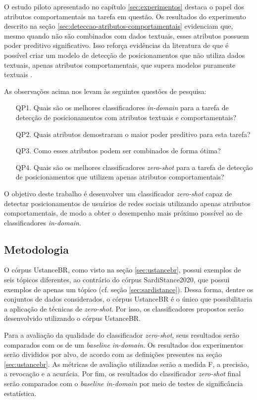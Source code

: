 \documentclass[
	12pt, oneside, a4paper, english, brazil
]{abntex2ppgsi}
\begin{document}
O estudo piloto apresentado no capítulo \ref{sec:experimentos} destaca o papel dos atributos comportamentais na tarefa em questão. Os resultados do experimento descrito na seção \ref{sec:deteccao-atributos-comportamentais} evidenciam que, mesmo quando não são combinados com dados textuais, esses atributos possuem poder preditivo significativo. Isso reforça evidências da literatura de que é possível criar um modelo de detecção de posicionamentos que não utiliza dados textuais, apenas atributos comportamentais, que supera modelos puramente textuais \cite{andrew2019}.

As observações acima nos levam às seguintes questões de pesquisa:
\begin{enumerate}
    \item[QP1.] Quais são os melhores classificadores {\em in-domain} para a tarefa de detecção de posicionamentos com atributos textuais e comportamentais?
    \item[QP2.] Quais atributos demostraram o maior poder preditivo para esta tarefa?
    \item[QP3.] Como esses atributos podem ser combinados de forma ótima?
    \item[QP4.] Quais são os melhores classificadores {\em zero-shot} para a tarefa de detecção de posicionamentos que utilizem apenas atributos comportamentais?
\end{enumerate}

O objetivo deste trabalho é desenvolver um classificador {\em zero-shot} capaz de detectar posicionamentos de usuários de redes sociais utilizando apenas atributos comportamentais, de modo a obter o desempenho mais próximo possível ao de classificadores {\em in-domain}.

\subsection{Metodologia}

O córpus UstanceBR, como visto na seção \ref{sec:ustancebr}, possui exemplos de seis tópicos diferentes, ao contrário do córpus SardiStance2020, que possui exemplos de apenas um tópico (cf. seção \ref{sec:sardistance}). Dessa forma, dentre os conjuntos de dados considerados, o córpus UstanceBR é o único que possibilitaria a aplicação de técnicas de {\em zero-shot}. Por isso, os classificadores propostos serão desenvolvido utilizando o córpus UstanceBR.

Para a avaliação da qualidade do classificador {\em zero-shot}, seus resultados serão comparados com os de um {\em baseline in-domain}. Os resultados dos experimentos serão divididos por alvo, de acordo com as definições presentes na seção \ref{sec:ustancebr}. As métricas de avaliação utilizadas serão a medida F, a precisão, a revocação e a acurácia. Por fim, os resultados do classificador {\em zero-shot} final serão comparados com o {\em baseline in-domain} por meio de testes de significância estatística.
\end{document}
